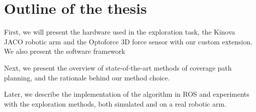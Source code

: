 \documentclass[buriama8_dp.tex]{subfiles}
\begin{document}
\section{Outline of the thesis}
\label{sec:outline}

First, we will present the hardware used in the exploration task, the Kinova JACO robotic arm and the Optoforce 3D force sensor with our custom extension. We also present the software framework 

Next, we present the overview of state-of-the-art methods of coverage path planning, and the rationale behind our method choice.

Later, we describe the implementation of the algorithm in ROS and experiments with the exploration methods, both simulated and on a real robotic arm.
\end{document}
